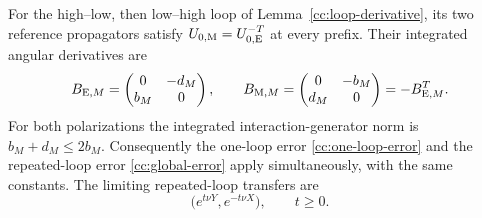 \begin{lemma}
\label{cd:loop}
For the high--low, then low--high loop of
Lemma~\ref{cc:loop-derivative}, its two reference propagators satisfy
$U_{0,{\rm M}}=U_{0,{\rm E}}^{-T}$ at every prefix.
Their integrated angular derivatives are
\begin{equation}\label{cd:loop-derivatives}
 B_{{\rm E},M}=\begin{pmatrix}0&-d_M\\b_M&0\end{pmatrix},
 \qquad
 B_{{\rm M},M}=\begin{pmatrix}0&-b_M\\d_M&0\end{pmatrix}
                 =-B_{{\rm E},M}^{T}.
\end{equation}
For both polarizations the integrated interaction-generator norm is
$b_M+d_M\leq2b_M$. Consequently the one-loop error
\eqref{cc:one-loop-error} and the repeated-loop error
\eqref{cc:global-error} apply simultaneously, with the same constants.
The limiting repeated-loop transfers are
\begin{equation}\label{cd:shear-pair}
 \bigl(e^{t\nu Y},e^{-t\nu X}\bigr),\qquad t\geq0.
\end{equation}
\end{lemma}
